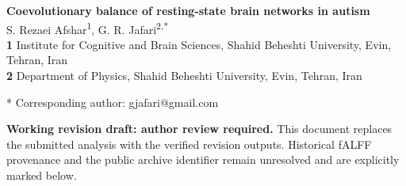 \documentclass[10pt,letterpaper]{article}
\begin{document}
\vspace*{0.2in}

\begin{flushleft}
{\Large
\textbf{Coevolutionary balance of resting-state brain networks in autism}
}
\newline
\\
S. Rezaei Afshar\textsuperscript{1},
G. R. Jafari\textsuperscript{2,*}
\\
\bigskip
\textbf{1} Institute for Cognitive and Brain Sciences, Shahid Beheshti University, Evin, Tehran, Iran
\\
\textbf{2} Department of Physics, Shahid Beheshti University, Evin, Tehran, Iran
\\
\bigskip

* Corresponding author: gjafari@gmail.com

\end{flushleft}

\noindent\textbf{Working revision draft: author review required.}
This document replaces the submitted analysis with the verified revision outputs.
Historical fALFF provenance and the public archive identifier remain unresolved
and are explicitly marked below.
\end{document}

